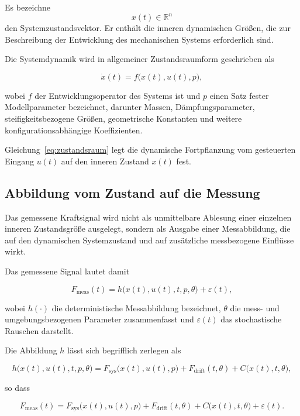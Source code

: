 \documentclass[12pt,a4paper]{report}
\begin{document}
Es bezeichne
\[
x(t) \in \mathbb{R}^{n}
\]
den Systemzustandsvektor. Er enthält die inneren dynamischen Größen, die
zur Beschreibung der Entwicklung des mechanischen Systems erforderlich
sind.

Die Systemdynamik wird in allgemeiner Zustandsraumform geschrieben als

\begin{equation}
\dot{x}(t) = f\bigl(x(t),u(t),p\bigr),
\label{eq:zustandsraum}
\end{equation}

wobei $f$ der Entwicklungsoperator des Systems ist und $p$ einen Satz
fester Modellparameter bezeichnet, darunter Massen, Dämpfungsparameter,
steifigkeitsbezogene Größen, geometrische Konstanten und weitere
konfigurationsabhängige Koeffizienten.

Gleichung~\eqref{eq:zustandsraum} legt die dynamische Fortpflanzung vom
gesteuerten Eingang $u(t)$ auf den inneren Zustand $x(t)$ fest.

\subsection{Abbildung vom Zustand auf die Messung}

Das gemessene Kraftsignal wird nicht als unmittelbare Ablesung einer
einzelnen inneren Zustandsgröße ausgelegt, sondern als Ausgabe einer
Messabbildung, die auf den dynamischen Systemzustand und auf zusätzliche
messbezogene Einflüsse wirkt.

Das gemessene Signal lautet damit

\begin{equation}
F_{\mathrm{meas}}(t) = h\bigl(x(t),u(t),t,p,\theta\bigr) + \varepsilon(t),
\label{eq:messabbildung}
\end{equation}

wobei $h(\cdot)$ die deterministische Messabbildung bezeichnet, $\theta$
die mess- und umgebungsbezogenen Parameter zusammenfasst und
$\varepsilon(t)$ das stochastische Rauschen darstellt.

Die Abbildung $h$ lässt sich begrifflich zerlegen als

\begin{equation}
h\bigl(x(t),u(t),t,p,\theta\bigr)
=
F_{\mathrm{sys}}\bigl(x(t),u(t),p\bigr)
+
F_{\mathrm{drift}}(t,\theta)
+
C\bigl(x(t),t,\theta\bigr),
\label{eq:h-zerlegung}
\end{equation}

so dass

\begin{equation}
F_{\mathrm{meas}}(t)
=
F_{\mathrm{sys}}\bigl(x(t),u(t),p\bigr)
+
F_{\mathrm{drift}}(t,\theta)
+
C\bigl(x(t),t,\theta\bigr)
+
\varepsilon(t).
\label{eq:zerlegung-voll}
\end{equation}
\end{document}
